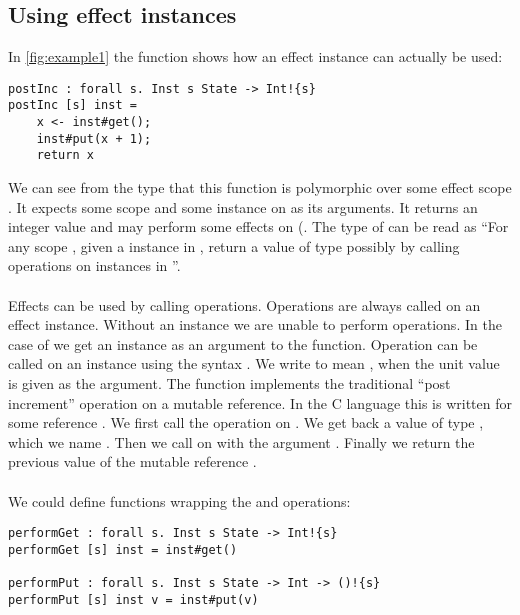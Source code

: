 \subsection{Using effect instances}
\label{subsection:instances}
In \cref{fig:example1} the function  shows how an effect instance can actually be used:
\begin{verbatim}
postInc : forall s. Inst s State -> Int!{s}
postInc [s] inst =
	x <- inst#get();
	inst#put(x + 1);
	return x
\end{verbatim}

We can see from the type that this function is polymorphic over some effect scope .
It expects some scope  and some  instance on  as its arguments.
It returns an integer value and may perform some effects on  (.
The type of  can be read as ``For any scope , given a  instance in , return a value of type  possibly by calling operations on instances in ''.
\\\\
Effects can be used by calling operations.
Operations are always called on an effect instance.
Without an instance we are unable to perform operations.
In the case of  we get an instance as an argument to the function.
Operation can be called on an instance using the syntax .
We write  to mean , when the unit value \ident{()} is given as the argument.
The function  implements the traditional ``post increment'' operation on a mutable reference.
In the C language this is written  for some reference .
We first call the  operation on .
We get back a value of type , which we name .
Then we call  on  with the argument .
Finally we return the previous value of the mutable reference .
\\\\
We could define functions wrapping the  and  operations:

\begin{verbatim}
performGet : forall s. Inst s State -> Int!{s}
performGet [s] inst = inst#get()

performPut : forall s. Inst s State -> Int -> ()!{s}
performPut [s] inst v = inst#put(v)
\end{verbatim}

